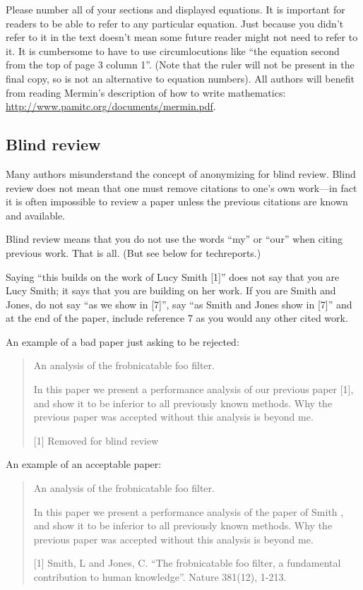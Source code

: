 \documentclass[10pt,twocolumn,letterpaper]{article}
\begin{document}
Please number all of your sections and displayed equations.  It is
important for readers to be able to refer to any particular equation.  Just
because you didn't refer to it in the text doesn't mean some future reader
might not need to refer to it.  It is cumbersome to have to use
circumlocutions like ``the equation second from the top of page 3 column
1''.  (Note that the ruler will not be present in the final copy, so is not
an alternative to equation numbers).  All authors will benefit from reading
Mermin's description of how to write mathematics:
\url{http://www.pamitc.org/documents/mermin.pdf}.


\subsection{Blind review}

Many authors misunderstand the concept of anonymizing for blind
review.  Blind review does not mean that one must remove
citations to one's own work---in fact it is often impossible to
review a paper unless the previous citations are known and
available.

Blind review means that you do not use the words ``my'' or ``our''
when citing previous work.  That is all.  (But see below for
techreports.)

Saying ``this builds on the work of Lucy Smith [1]'' does not say
that you are Lucy Smith; it says that you are building on her
work.  If you are Smith and Jones, do not say ``as we show in
[7]'', say ``as Smith and Jones show in [7]'' and at the end of the
paper, include reference 7 as you would any other cited work.

An example of a bad paper just asking to be rejected:
\begin{quote}
\begin{center}
    An analysis of the frobnicatable foo filter.
\end{center}

   In this paper we present a performance analysis of our
   previous paper [1], and show it to be inferior to all
   previously known methods.  Why the previous paper was
   accepted without this analysis is beyond me.

   [1] Removed for blind review
\end{quote}


An example of an acceptable paper:

\begin{quote}
\begin{center}
     An analysis of the frobnicatable foo filter.
\end{center}

   In this paper we present a performance analysis of the
   paper of Smith \etal [1], and show it to be inferior to
   all previously known methods.  Why the previous paper
   was accepted without this analysis is beyond me.

   [1] Smith, L and Jones, C. ``The frobnicatable foo
   filter, a fundamental contribution to human knowledge''.
   Nature 381(12), 1-213.
\end{quote}
\end{document}
